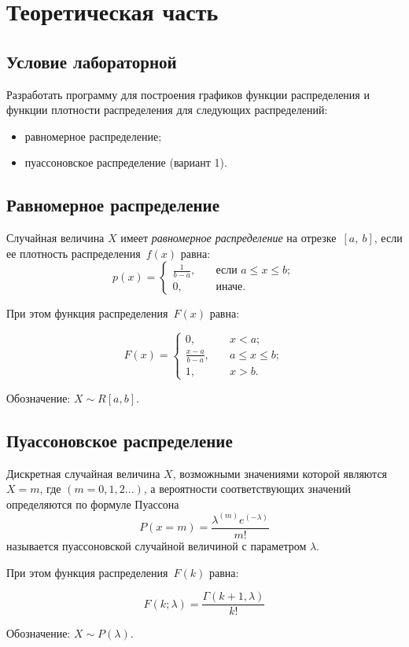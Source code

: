 \chapter{Теоретическая часть}


\section{Условие лабораторной}

Разработать программу для построения графиков функции распределения и функции плотности распределения для следующих распределений: 
\begin{itemize}
	\item равномерное распределение;
	\item пуассоновское распределение (вариант 1).
\end{itemize} 

\section{Равномерное распределение}

Случайная величина $X$ имеет \textit{равномерное распределение} на отрезке~$[a,~b]$, если ее плотность распределения~$f(x)$ равна:
\begin{equation}
	p(x) =
	\begin{cases}
		\displaystyle\frac{1}{b - a}, & \quad \text{если } a \leq x \leq b;\\
		0,  & \quad \text{иначе}.
	\end{cases}
\end{equation}

При этом функция распределения~$F(x)$ равна:

\begin{equation}
	F(x) =
	\begin{cases}
		0,  & \quad x < a;\\
		\displaystyle\frac{x - a}{b - a}, & \quad a \leq x \leq b;\\
		1,  & \quad x > b.
	\end{cases}
\end{equation}

Обозначение: $X \sim R[a, b]$.

\clearpage

\section{Пуассоновское распределение}

Дискретная случайная величина $X$, возможными значениями которой являются $X=m$, где $(m=0,1,2...)$, а вероятности соответствующих значений определяются по формуле Пуассона
\begin{equation}
	P(x = m) = \frac{\lambda^{(m)} e^{(-\lambda)}}{m!}	
\end{equation}
называется пуассоновской случайной величиной с параметром $\lambda$.

При этом функция распределения~$F(k)$ равна:

\begin{equation}
	F(k; \lambda) = \frac{\Gamma(k+1, \lambda)}{k!}
\end{equation}



Обозначение: $X \sim P(\lambda)$.


